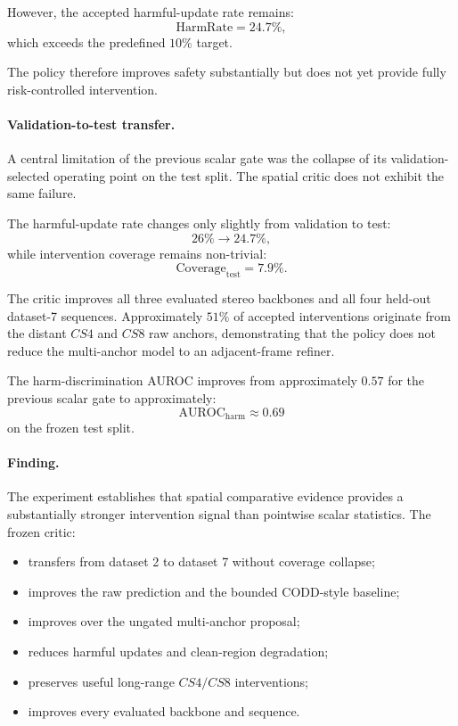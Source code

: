 \documentclass[11pt,a4paper]{article}
\begin{document}
However, the accepted harmful-update rate remains:
\begin{equation}
    \mathrm{HarmRate}=24.7\%,
\end{equation}
which exceeds the predefined \(10\%\) target.

The policy therefore improves safety substantially but does not yet provide
fully risk-controlled intervention.

\paragraph{Validation-to-test transfer.}

A central limitation of the previous scalar gate was the collapse of its
validation-selected operating point on the test split. The spatial critic does
not exhibit the same failure.

The harmful-update rate changes only slightly from validation to test:
\begin{equation}
    26\% \rightarrow 24.7\%,
\end{equation}
while intervention coverage remains non-trivial:
\begin{equation}
    \mathrm{Coverage}_{\mathrm{test}}=7.9\%.
\end{equation}

The critic improves all three evaluated stereo backbones and all four held-out
dataset-7 sequences. Approximately \(51\%\) of accepted interventions originate
from the distant \(CS4\) and \(CS8\) raw anchors, demonstrating that the policy
does not reduce the multi-anchor model to an adjacent-frame refiner.

The harm-discrimination AUROC improves from approximately \(0.57\) for the
previous scalar gate to approximately:
\begin{equation}
    \mathrm{AUROC}_{\mathrm{harm}}\approx0.69
\end{equation}
on the frozen test split.

\paragraph{Finding.}

The experiment establishes that spatial comparative evidence provides a
substantially stronger intervention signal than pointwise scalar statistics.
The frozen critic:

\begin{itemize}
    \item transfers from dataset 2 to dataset 7 without coverage collapse;
    \item improves the raw prediction and the bounded CODD-style baseline;
    \item improves over the ungated multi-anchor proposal;
    \item reduces harmful updates and clean-region degradation;
    \item preserves useful long-range \(CS4/CS8\) interventions;
    \item improves every evaluated backbone and sequence.
\end{itemize}
\end{document}
